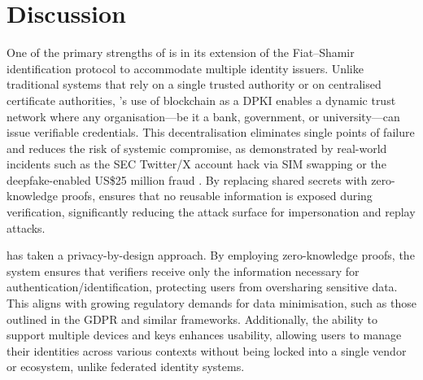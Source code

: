 \section{Discussion}
\label{sec::chp6::discussion}

One of the primary strengths of \deeid is in its extension of the Fiat--Shamir identification protocol to accommodate multiple identity issuers. Unlike traditional systems that rely on a single trusted authority or on centralised certificate authorities, \deeid's use of blockchain as a DPKI enables a dynamic trust network where any organisation—be it a bank, government, or university—can issue verifiable credentials. This decentralisation eliminates single points of failure and reduces the risk of systemic compromise, as demonstrated by real-world incidents such as the SEC Twitter/X account hack via SIM swapping \cite{kan_hijack_2024} or the deepfake-enabled US\$25 million fraud \cite{milmo_uk_2024}. By replacing shared secrets with zero-knowledge proofs, \deeid ensures that no reusable information is exposed during verification, significantly reducing the attack surface for impersonation and replay attacks.


\deeid has taken a privacy-by-design approach. By employing zero-knowledge proofs, the system ensures that verifiers receive only the information necessary for authentication/identification, protecting users from oversharing sensitive data. This aligns with growing regulatory demands for data minimisation, such as those outlined in the GDPR and similar frameworks. Additionally, the ability to support multiple devices and keys enhances usability, allowing users to manage their identities across various contexts without being locked into a single vendor or ecosystem, unlike federated identity systems.

